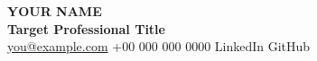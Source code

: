 \documentclass[10pt,a4paper]{article}
\begin{document}
\small
\begin{center}
  {\fontsize{23}{26}\selectfont\bfseries\color{ink} YOUR NAME}\\[2pt]
  {\normalsize\color{accent}\textbf{Target Professional Title}}\\[3pt]
  {\small \href{mailto:you@example.com}{you@example.com} \textbar{} +00 000 000 0000 \textbar{} LinkedIn \textbar{} GitHub}
\end{center}






\end{document}
